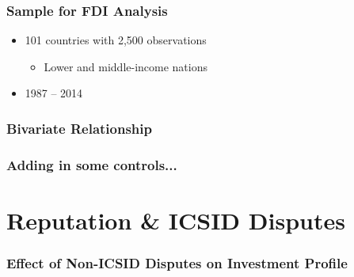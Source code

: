 \documentclass[10pt]{beamer}
\begin{document}
\begin{frame}
\frametitle{Sample for FDI Analysis}

\pause
\begin{itemize}
	\item 101 countries with 2,500 observations
	\begin{itemize}
		\item Lower and middle-income nations
	\end{itemize}
	\item 1987 -- 2014
\end{itemize}

\end{frame}

\begin{frame}
\frametitle{Bivariate Relationship}

\pause
\begin{figure}[ht]
	\centering
	\resizebox{1\textwidth}{!}{}	
\end{figure}

\end{frame}

\begin{frame}
\frametitle{Adding in some controls...}

\pause
\begin{figure}[ht]
	\centering
	\vspace{-5mm}
	\resizebox{1\textwidth}{!}{}	
\end{figure}

\end{frame}

\section{Reputation \& ICSID Disputes}

\begin{frame}
\frametitle{Effect of Non-ICSID Disputes on Investment Profile}

\pause
\begin{figure}[ht]
	\centering
	\vspace{-5mm}	
	\resizebox{1\textwidth}{!}{}	
\end{figure}

\end{frame}
\end{document}
